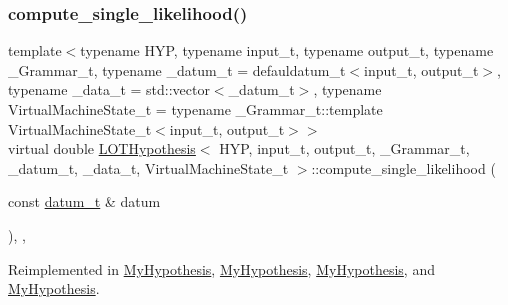 \subsubsection{\texorpdfstring{compute\+\_\+single\+\_\+likelihood()}{compute\_single\_likelihood()}}
{\footnotesize\ttfamily template$<$typename H\+YP, typename input\+\_\+t, typename output\+\_\+t, typename \+\_\+\+Grammar\+\_\+t, typename \+\_\+datum\+\_\+t = defauldatum\+\_\+t$<$input\+\_\+t, output\+\_\+t$>$, typename \+\_\+data\+\_\+t = std\+::vector$<$\+\_\+datum\+\_\+t$>$, typename Virtual\+Machine\+State\+\_\+t = typename \+\_\+\+Grammar\+\_\+t\+::template Virtual\+Machine\+State\+\_\+t$<$input\+\_\+t, output\+\_\+t$>$$>$ \\
virtual double \hyperlink{class_l_o_t_hypothesis}{L\+O\+T\+Hypothesis}$<$ H\+YP, input\+\_\+t, output\+\_\+t, \+\_\+\+Grammar\+\_\+t, \+\_\+datum\+\_\+t, \+\_\+data\+\_\+t, Virtual\+Machine\+State\+\_\+t $>$\+::compute\+\_\+single\+\_\+likelihood (\begin{DoxyParamCaption}\item[{const \hyperlink{class_l_o_t_hypothesis_ae36b1f113f45ee5ac82660028672739b}{datum\+\_\+t} \&}]{datum }\end{DoxyParamCaption})\hspace{0.3cm}{\ttfamily [inline]}, {\ttfamily [override]}, {\ttfamily [virtual]}}



Reimplemented in \hyperlink{class_my_hypothesis_af2470b1e04711c06ee551deae15af4c1}{My\+Hypothesis}, \hyperlink{class_my_hypothesis_a480fc9e50d0faa0f5226f56187fd2eec}{My\+Hypothesis}, \hyperlink{class_my_hypothesis_af23a45a03a28ea4f42438e70d47acacb}{My\+Hypothesis}, and \hyperlink{class_my_hypothesis_af23a45a03a28ea4f42438e70d47acacb}{My\+Hypothesis}.

\mbox{\label{class_l_o_t_hypothesis_ab24d0b8faa360f6a0edc4eefb17d6de7}} 
